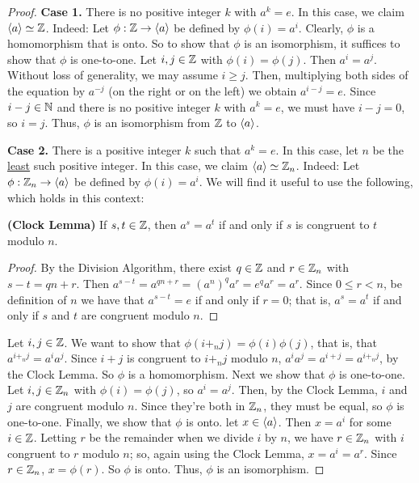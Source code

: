 \begin{proof}%

\textbf{Case 1.} There is no positive integer $k$ with $a^k=e$. In this case, we claim $\langle a\rangle\simeq \mathbb{Z}$. Indeed: Let $\phi:\mathbb{Z}\to \langle a\rangle$ be defined by $\phi(i)=a^i$. Clearly, $\phi$ is a homomorphism that is onto. So to show that $\phi$ is an isomorphism, it suffices to show that $\phi$ is one-to-one.  Let $i,j\in \mathbb{Z}$ with $\phi(i)=\phi(j)$.  Then $a^i=a^j$.  Without loss of generality, we may assume $i\geq j$.  Then, multiplying both sides of the equation by $a^{-j}$ (on the right or on the left) we obtain $a^{i-j}=e$.  Since $i-j\in \mathbb{N}$ and there is no positive integer $k$ with $a^k=e$, we must have $i-j=0$, so $i=j$. Thus, $\phi$ is an isomorphism from $\mathbb{Z}$ to $\langle a\rangle$.

\textbf{Case 2.} There is a positive integer $k$ such that $a^k=e$.  In this case, let $n$ be the \underline{least} such positive integer. In this case, we claim $\langle a\rangle\simeq \mathbb{Z}_n$. Indeed: Let $\phi:\mathbb{Z}_n\to \langle a\rangle$ be defined by $\phi(i)=a^i$. We will find it useful to use the following, which holds in this context:


\begin{lem}\label{}\textbf{(Clock Lemma)} If $s,t\in \mathbb{Z}$, then $a^s=a^t$ if and only if $s$ is congruent to $t$ modulo $n$.\end{lem}

\begin{proof}By the Division Algorithm, there exist $q\in \mathbb{Z}$ and $r\in \mathbb{Z}_n$ with $s-t=qn+r$. Then $a^{s-t}=a^{qn+r}=(a^n)^qa^r=e^qa^r=a^r$. Since $0\leq r<n$, be definition of $n$ we have that $a^{s-t}=e$ if and only if $r=0$; that is, $a^s=a^t$ if and only if $s$ and $t$ are congruent modulo $n$.\end{proof}


Let $i,j\in \mathbb{Z}$.  We want to show that $\phi(i+_nj)=\phi(i)\phi(j)$, that is, that $a^{i+_nj}=a^ia^j$. Since $i+j$ is congruent to $i+_nj$ modulo $n$, $a^ia^j=a^{i+j}=a^{i+_nj}$, by the Clock Lemma. So $\phi$ is a homomorphism. Next we show that $\phi$ is one-to-one.  Let $i,j\in \mathbb{Z}_n$ with $\phi(i)=\phi(j)$, so $a^i=a^j$.  Then, by the Clock Lemma, $i$ and $j$ are congruent modulo $n$. Since they're both in $\mathbb{Z}_n$, they must be equal,
so $\phi$ is one-to-one. Finally, we show that $\phi$ is onto. let $x\in \langle a\rangle$.  Then $x=a^i$ for some $i\in \mathbb{Z}$. Letting $r$ be the remainder when we divide $i$ by $n$, we have $r\in \mathbb{Z}_n$ with $i$ congruent to $r$ modulo $n$; so, again using the Clock Lemma, $x=a^i=a^r$. Since $r\in \mathbb{Z}_n$, $x=\phi(r)$. So $\phi$ is onto. Thus, $\phi$ is an isomorphism.\end{proof}



